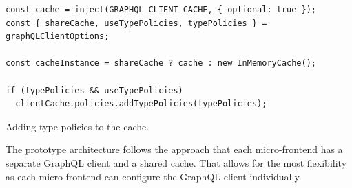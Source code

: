\ifshowListings
\begin{listing}[H]
\begin{verbatim}
const cache = inject(GRAPHQL_CLIENT_CACHE, { optional: true });
const { shareCache, useTypePolicies, typePolicies } = graphQLClientOptions;

const cacheInstance = shareCache ? cache : new InMemoryCache();

if (typePolicies && useTypePolicies)
  clientCache.policies.addTypePolicies(typePolicies);
\end{verbatim}
\caption{Adding type policies to the cache.}\label{code:applied-methods:adding-extra-type-policies}
\end{listing}
\fi

\noindent The prototype architecture follows the approach that each micro-frontend has a separate GraphQL client and a shared cache. That allows for the most flexibility as each micro frontend can configure the GraphQL client individually.